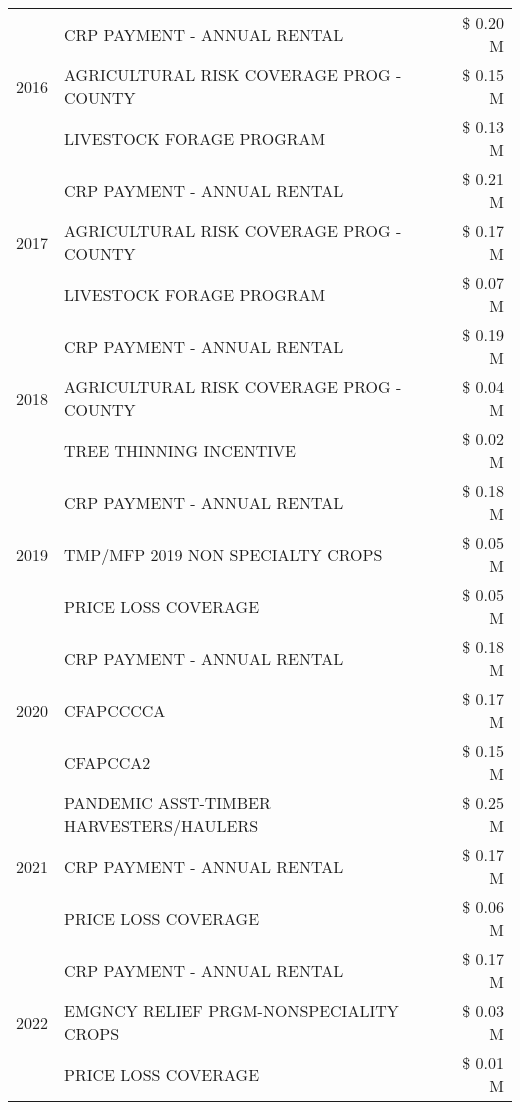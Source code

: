 \begin{tabular}{llr}
\cline{1-3}
\multirow[t]{3}{*}{2016} & CRP PAYMENT - ANNUAL RENTAL & \$ 0.20 M \\
 & AGRICULTURAL RISK COVERAGE PROG - COUNTY & \$ 0.15 M \\
 & LIVESTOCK FORAGE PROGRAM & \$ 0.13 M \\
\cline{1-3}
\multirow[t]{3}{*}{2017} & CRP PAYMENT - ANNUAL RENTAL & \$ 0.21 M \\
 & AGRICULTURAL RISK COVERAGE PROG - COUNTY & \$ 0.17 M \\
 & LIVESTOCK FORAGE PROGRAM & \$ 0.07 M \\
\cline{1-3}
\multirow[t]{3}{*}{2018} & CRP PAYMENT - ANNUAL RENTAL & \$ 0.19 M \\
 & AGRICULTURAL RISK COVERAGE PROG - COUNTY & \$ 0.04 M \\
 & TREE THINNING INCENTIVE & \$ 0.02 M \\
\cline{1-3}
\multirow[t]{3}{*}{2019} & CRP PAYMENT - ANNUAL RENTAL & \$ 0.18 M \\
 & TMP/MFP 2019 NON SPECIALTY CROPS & \$ 0.05 M \\
 & PRICE LOSS COVERAGE & \$ 0.05 M \\
\cline{1-3}
\multirow[t]{3}{*}{2020} & CRP PAYMENT - ANNUAL RENTAL & \$ 0.18 M \\
 & CFAPCCCCA & \$ 0.17 M \\
 & CFAPCCA2 & \$ 0.15 M \\
\cline{1-3}
\multirow[t]{3}{*}{2021} & PANDEMIC ASST-TIMBER HARVESTERS/HAULERS & \$ 0.25 M \\
 & CRP PAYMENT - ANNUAL RENTAL & \$ 0.17 M \\
 & PRICE LOSS COVERAGE & \$ 0.06 M \\
\cline{1-3}
\multirow[t]{3}{*}{2022} & CRP PAYMENT - ANNUAL RENTAL & \$ 0.17 M \\
 & EMGNCY RELIEF PRGM-NONSPECIALITY CROPS & \$ 0.03 M \\
 & PRICE LOSS COVERAGE & \$ 0.01 M \\
\cline{1-3}
\bottomrule
\end{tabular}
